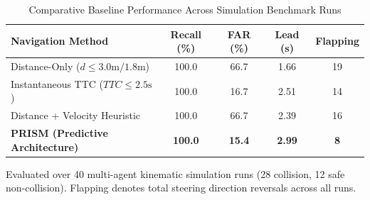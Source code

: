 \begin{table}[t]
\caption{Comparative Baseline Performance Across Simulation Benchmark Runs}
\label{tab:baselines}
\centering
\footnotesize
\setlength{\tabcolsep}{3pt}
\begin{tabularx}{\columnwidth}{Xcccc}
\toprule
\textbf{Navigation Method} & \textbf{Recall (\%)} & \textbf{FAR (\%)} & \textbf{Lead (s)} & \textbf{Flapping} \\
\midrule
Distance-Only ($d \le 3.0\text{m} / 1.8\text{m}$) & 100.0 & 66.7 & 1.66 & 19 \\
Instantaneous TTC ($TTC \le 2.5\text{s}$) & 100.0 & 16.7 & 2.51 & 14 \\
Distance + Velocity Heuristic & 100.0 & 66.7 & 2.39 & 16 \\
\textbf{PRISM (Predictive Architecture)} & \textbf{100.0} & \textbf{15.4} & \textbf{2.99} & \textbf{8} \\
\bottomrule
\end{tabularx}
\vspace{0.04cm}
\par{\raggedright \scriptsize Evaluated over 40 multi-agent kinematic simulation runs (28 collision, 12 safe non-collision). Flapping denotes total steering direction reversals across all runs.\par}
\end{table}
